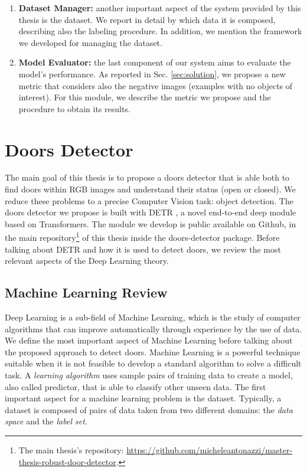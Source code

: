 \begin{enumerate}
	\item \textbf{Dataset Manager:} another important aspect of the system provided by this thesis is the dataset. We report in detail by which data it is composed, describing also the labeling procedure. In addition, we mention the framework we developed for managing the dataset.
	\item  \textbf{Model Evaluator:} the last component of our system aims to evaluate the model's performance. As reported in Sec. \ref{sec:solution}, we propose a new metric that considers also the negative images (examples with no objects of interest). For this module, we describe the metric we propose and the procedure to obtain its results.
\end{enumerate}


\section{Doors Detector}
\label{sec:doors_detector}

The main goal of this thesis is to propose a doors detector that is able both to find doors within RGB images and understand their status (open or closed). We reduce these problems to a precise Computer Vision task: object detection. The doors detector we propose is built with DETR \cite{detr}, a novel end-to-end deep module based on Transformers. The module we develop is public available on Github, in the main repository\footnote{The main thesis's repository: \url{https://github.com/micheleantonazzi/master-thesis-robust-door-detector}.} of this thesis inside the \textsf{doors-detector} package. Before talking about DETR and how it is used to detect doors, we review the most relevant aspects of the Deep Learning theory.

\subsection{Machine Learning Review}
\label{sec:machine_learning}
Deep Learning is a sub-field of Machine Learning, which is the study of computer algorithms that can improve automatically through experience by the use of data. We define the most important aspect of Machine Learning before talking about the proposed approach to detect doors. Machine Learning is a powerful technique suitable when it is not feasible to develop a standard algorithm to solve a difficult task. A \textit{learning algorithm} uses sample pairs of training data to create a model, also called predictor, that is able to classify other unseen data. The first important aspect for a machine learning problem is the dataset. Typically, a dataset is composed of pairs of data taken from two different domains: the \textit{data space} and the \textit{label set}.

